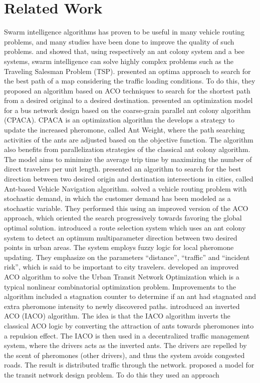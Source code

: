 \section{Related Work}


Swarm intelligence algorithms has proven to be useful in many vehicle routing problems, and many studies have been done to improve the quality of such problems. \citet{dorigo97} and \citet{lucic03} showed that, using respectively an ant colony system and a bee systems, swarm intelligence can solve highly complex problems such as the Traveling Salesman Problem (TSP). \citet{hsiao04} presented an optima approach to search for the best path of a map considering the traffic loading conditions. To do this, they proposed an algorithm based on ACO techniques to search for the shortest path from a desired original to a desired destination. \citet{yang07} presented an optimization model for a bus network design based on the coarse-grain parallel ant colony algorithm (CPACA). CPACA is an optimization algorithm the develops a strategy to update the increased pheromone, called Ant Weight, where the path searching activities of the ants are adjusted based on the objective function. The algorithm also benefits from parallelization strategies of the classical ant colony algorithm. The model aims to minimize the average trip time by maximizing the number of direct travelers per unit length. \citet{salehi-nezhad07} presented an algorithm to search for the best direction between two desired origin and destination intersections in cities, called Ant-based Vehicle Navigation algorithm. \citet{tripathi09} solved a vehicle routing problem with stochastic demand, in which the customer demand has been modeled as a stochastic variable. They performed this using an improved version of the ACO approach, which oriented the search progressively towards favoring the global optimal solution. \citet{salehinejad10} introduced a route selection system which uses an ant colony system to detect an optimum multiparameter direction between two desired points in urban areas. The system employs fuzzy logic for local pheromone updating. They emphasize on the parameters ``distance'', ``traffic'' and ``incident risk'', which is said to be important to city travelers. \citet{jiang10} developed an improved ACO algorithm to solve the Urban Transit Network Optimization which is a typical nonlinear combinatorial optimization problem. Improvements to the algorithm included a stagnation counter to determine if an ant had stagnated and extra pheromone intensity to newly discovered paths. \citet{dias14} introduced an inverted ACO (IACO) algorithm. The idea is that the IACO algorithm inverts the classical ACO logic by converting the attraction of ants towards pheromones into a repulsion effect. The IACO is then used in a decentralized traffic management system, where the drivers acts as the inverted ants. The drivers are repelled by the scent of pheromones (other drivers), and thus the system avoids congested roads. The result is distributed traffic through the network. \citet{nikolic14} proposed a model for the transit network design problem. To do this they used an approach 
